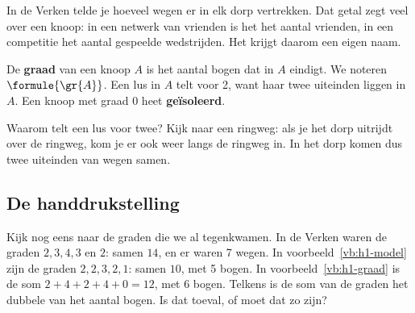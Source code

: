 In de Verken telde je hoeveel wegen er in elk dorp vertrekken. Dat getal zegt veel over een knoop: in een netwerk van vrienden is het het aantal vrienden, in een competitie het aantal gespeelde wedstrijden. Het krijgt daarom een eigen naam.

\begin{theorie}
De \textbf{\textcolor{accent}{graad}} van een knoop $A$ is het aantal bogen dat in $A$ eindigt. We noteren $\formule{\gr{A}}$. Een lus in $A$ telt voor 2, want haar twee uiteinden liggen in $A$. Een knoop met graad 0 heet \textbf{\textcolor{accent}{geïsoleerd}}.
\end{theorie}

Waarom telt een lus voor twee? Kijk naar een ringweg: als je het dorp uitrijdt over de ringweg, kom je er ook weer langs de ringweg in. In het dorp komen dus twee uiteinden van wegen samen.


\begin{oefeningen}
\end{oefeningen}

\subsection{De handdrukstelling}

Kijk nog eens naar de graden die we al tegenkwamen. In de Verken waren de graden $2, 3, 4, 3$ en $2$: samen $14$, en er waren 7 wegen. In voorbeeld~\ref{vb:h1-model} zijn de graden $2, 2, 3, 2, 1$: samen $10$, met 5 bogen. In voorbeeld~\ref{vb:h1-graad} is de som $2 + 4 + 2 + 4 + 0 = 12$, met 6 bogen. Telkens is de som van de graden het dubbele van het aantal bogen. Is dat toeval, of moet dat zo zijn?

